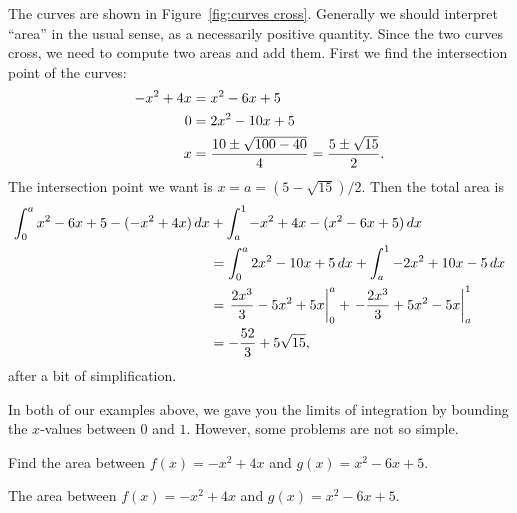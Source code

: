 \begin{solution}
The curves are shown in Figure~\ref{fig:curves cross}. Generally we
should interpret ``area'' in the usual sense, as a necessarily
positive quantity. Since the two curves cross, we need to compute two
areas and add them. First we find the intersection point of the
curves:
\begin{align*}
  -x^2+4x&=x^2-6x+5 \\
  0&=2x^2-10x+5 \\
  x&={10\pm\sqrt{100-40}\over4}={5\pm\sqrt{15}\over2}.
\end{align*}
The intersection point we want is $x=a=(5-\sqrt{15})/2$. Then
the total area is 
\begin{align*}
  \int_0^a x^2-6x+5-(-x^2+4x)\, d x&+\int_a^1 -x^2+4x-(x^2-6x+5)\, d x \\
  &=\int_0^a 2x^2-10x+5\, d x+\int_a^1 -2x^2+10x-5\, d x \\
  &=\left.{2x^3\over3}-5x^2+5x\right|_0^a + 
    \left.-{2x^3\over3}+5x^2-5x\right|_a^1 \\
  &=-{52\over3}+5\sqrt{15},
\end{align*}
after a bit of simplification.
\end{solution}


In both of our examples above, we gave you the limits of integration
by bounding the $x$-values between $0$ and $1$. However, some problems
are not so simple.

\begin{example} Find the area between $f(x)= -x^2+4x$ and
$g(x)=x^2-6x+5$.
\end{example}

\begin{marginfigure}
\caption{The area between $f(x)= -x^2+4x$ and $g(x)=x^2-6x+5$.}
\label{fig:area bounded by curves}
\end{marginfigure}

